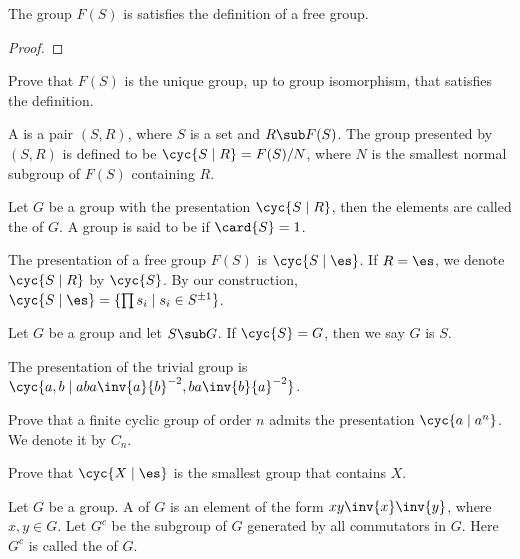 \documentclass[10pt]{article}
\begin{document}
\begin{proposition}
    The group $F(S)$ is satisfies the definition of a free group.
\end{proposition}
\begin{proof}
    
\end{proof}
\begin{problem}
    Prove that $F(S)$ is the unique group, up to group isomorphism, that satisfies the definition.
\end{problem}
\begin{definition}
    A  is a pair $(S,R)$, where $S$ is a set and $R\sub F(S)$. The group presented by $(S,R)$ is defined to be $\cyc{S\mid R}=F(S)/N$, where $N$ is the smallest normal subgroup of $F(S)$ containing $R$.
\end{definition}
\begin{definition}
    Let $G$ be a group with the presentation $\cyc{S\mid R}$, then the elements are called the  of $G$. A group is said to be  if $\card{S}=1$.
\end{definition}
\begin{example}
    The presentation of a free group $F(S)$ is $\cyc{S\mid\es}$. If $R=\es$, we denote $\cyc{S\mid R}$ by $\cyc{S}$. By our construction, $\cyc{S\mid\es}=\{\prod{s}_{i}\mid{s}_{i}\in{S}^{\pm 1}\}$.
\end{example}
\par
Let $G$ be a group and let $S\sub G$. If $\cyc{S}=G$, then we say $G$ is  $S$.
\begin{example}
    The presentation of the trivial group is $\cyc{a,b\mid aba\inv{a}{b}^{-2},ba\inv{b}{a}^{-2}}$.
\end{example}
\begin{problem}
    Prove that a finite cyclic group of order $n$ admits the presentation $\cyc{a\mid{a}^{n}}$. We denote it by ${C}_{n}$.
\end{problem}
\begin{problem}
    Prove that $\cyc{X\mid\es}$ is the smallest group that contains $X$.
\end{problem}
\begin{definition}
    Let $G$ be a group. A  of $G$ is an element of the form $xy\inv{x}\inv{y}$, where $x,y\in G$. Let ${G}^{c}$ be the subgroup of $G$ generated by all commutators in $G$. Here ${G}^{c}$ is called the  of $G$.
\end{definition}
\end{document}
